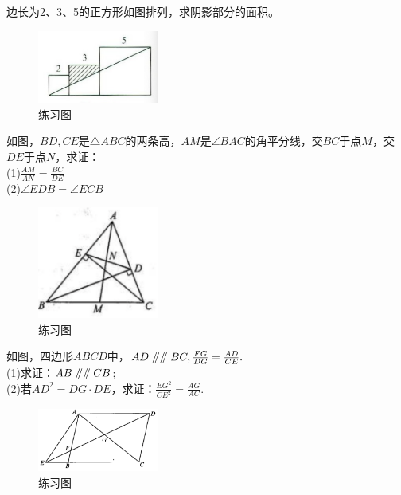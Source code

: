 \documentclass{ecnuthesis}
\newcommand\px{\mathrel{/\mkern-5mu/}}  %
\begin{document}
\begin{problem}
    边长为2、3、5的正方形如图排列，求阴影部分的面积。
\end{problem}
\begin{figure}[H]
\centering
\includegraphics[width=4cm]{picture/834.png}
\caption{练习图}
\end{figure}
\begin{problem}
    如图，$BD,CE$是$\triangle ABC$的两条高，$AM$是$\angle BAC$的角平分线，交$BC$于点$M$，交$DE$于点$N$，求证：\\
    (1)$\frac{AM}{AN}=\frac{BC}{DE}$ \\
    (2)$\angle EDB=\angle ECB$ \\
\end{problem}
\begin{figure}[H]
\centering
\includegraphics[width=4cm]{picture/816.png}
\caption{练习图}
\end{figure}
\begin{problem}
    如图，四边形$ABCD$中，$AD\px \px BC,\frac{FG}{DG}=\frac{AD}{CE}.$ \\
    (1)求证：$AB \px \px CB$; \\
    (2)若$AD^2=DG·DE$，求证：$\frac{EG^2}{CE^2}=\frac{AG}{AC}.$ \\
\end{problem}
\begin{figure}[H]
\centering
\includegraphics[width=4cm]{picture/837.png}
\caption{练习图}
\end{figure}
\clearpage
\end{document}
